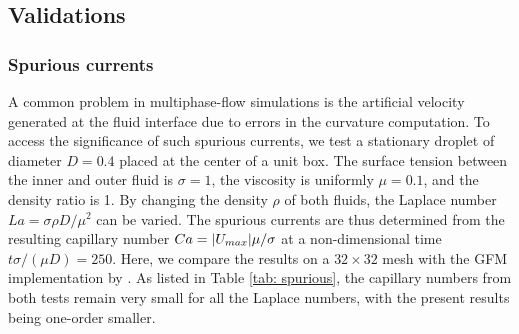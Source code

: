 

\subsection{Validations}
\label{sec: validations}


\subsubsection{Spurious currents}
\label{sec: spurious}


A common problem in multiphase-flow simulations is the artificial velocity generated at the fluid interface due to errors in the curvature computation. To access the significance of such spurious currents, we test a stationary droplet of diameter $D=0.4$ placed at the center of a unit box. The surface tension between the inner and outer fluid is $\sigma=1$, the viscosity is uniformly $\mu=0.1$, and the density ratio is 1. By changing the density $\rho$ of both fluids, the Laplace number $La=\sigma \rho D /\mu^2$ can be varied. The spurious currents are thus determined from the resulting capillary number $Ca=\lvert U_{max}\rvert \mu / \sigma$ at a non-dimensional time $t\sigma/(\mu D)=250$. Here, we compare the results on a $32\times32$ mesh with the GFM implementation by \cite{Desjardins_JCP_2008}. As listed in Table \ref{tab: spurious}, the capillary numbers from both tests remain very small for all the Laplace numbers, with the present results being one-order smaller. 

